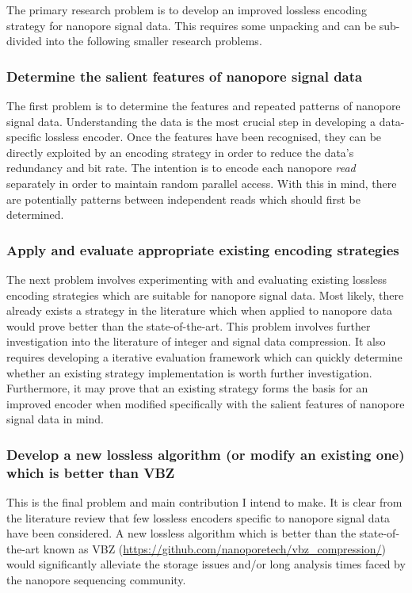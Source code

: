 The primary research problem is to develop an improved lossless encoding strategy for nanopore signal data. This requires some unpacking and can be sub-divided into the following smaller research problems.

\subsubsection{Determine the salient features of nanopore signal data}
The first problem is to determine the features and repeated patterns of nanopore signal data. Understanding the data is the most crucial step in developing a data-specific lossless encoder. Once the features have been recognised, they can be directly exploited by an encoding strategy in order to reduce the data's redundancy and bit rate. The intention is to encode each nanopore \textit{read} separately in order to maintain random parallel access. With this in mind, there are potentially patterns between independent reads which should first be determined.

\subsubsection{Apply and evaluate appropriate existing encoding strategies}
The next problem involves experimenting with and evaluating existing lossless encoding strategies which are suitable for nanopore signal data. Most likely, there already exists a strategy in the literature which when applied to nanopore data would prove better than the state-of-the-art. This problem involves further investigation into the literature of integer and signal data compression. It also requires developing a iterative evaluation framework which can quickly determine whether an existing strategy implementation is worth further investigation. Furthermore, it may prove that an existing strategy forms the basis for an improved encoder when modified specifically with the salient features of nanopore signal data in mind.

\subsubsection{Develop a new lossless algorithm (or modify an existing one) which is better than VBZ}
This is the final problem and main contribution I intend to make. It is clear from the literature review that few lossless encoders specific to nanopore signal data have been considered. A new lossless algorithm which is better than the state-of-the-art known as VBZ (\url{https://github.com/nanoporetech/vbz_compression/}) would significantly alleviate the storage issues and/or long analysis times faced by the nanopore sequencing community.
